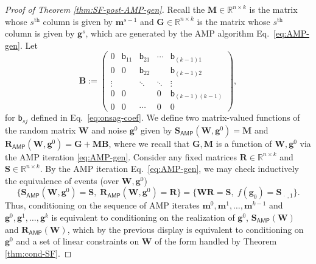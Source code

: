 \documentclass[]{article}
\def\bR{{\boldsymbol R}}
\def\sb{{\mathsf b}}
\def\bW{{\boldsymbol W}}
\def\bM{{\boldsymbol M}}
\def\bS{\boldsymbol{S}}
\def\bB{{\boldsymbol B}}
\def\bg{{\boldsymbol g}}
\def\reals{{\mathbb R}}
\def\bW{{\boldsymbol W}}
\def\bG{{\boldsymbol G}}
\def\bg{{\boldsymbol g}}
\def\bbm{{\boldsymbol m}}
\def\AMP{\mathsf{AMP}}
\begin{document}
\begin{proof}[Proof of Theorem \ref{thm:SF-post-AMP-gen}]
    Recall the $\bM \in \reals^{n \times k}$ is the matrix whose $s^\text{th}$ column is given by $\bbm^{s-1}$ and $\bG \in \reals^{n \times k}$ is the matrix whose $s^\text{th}$ column is given by $\bg^s$, 
    which are generated by the AMP algorithm Eq.~\eqref{eq:AMP-gen}.
    Let 
    \begin{equation}
        \bB 
        := 
        \begin{pmatrix}
            0      & \sb_{11} & \sb_{21}     & \cdots & \sb_{(k-1)1} \\[5pt]
            0      & 0     & \sb_{22} & & \sb_{(k-1)2} \\[5pt]
            \vdots &       & \ddots     & \ddots & \vdots \\[5pt]
            0 &  0     &       & 0 & \sb_{(k-1)(k-1)} \\[5pt]
            0      & 0     &    \cdots   & 0 & 0
        \end{pmatrix},
    \end{equation}
    for $\sb_{sj}$ defined in Eq.~\eqref{eq:onsag-coef}.
    We define two matrix-valued functions of the random matrix $\bW$ and noise $\bg^0$
    given by $\bS_{\AMP}(\bW,\bg^0) = \bM$ and $\bR_{\AMP}(\bW,\bg^0) = \bG + \bM \bB$,
    where we recall that $\bG,\bM$ is a function of $\bW,\bg^0$ via the AMP iteration \eqref{eq:AMP-gen}.
    Consider any fixed matrices $\bR \in \reals^{n \times k}$ and $\bS \in \reals^{n \times k}$.
    By the AMP iteration Eq.~\eqref{eq:AMP-gen},
    we may check inductively the equivalence of events (over $\bW,\bg^0$)
    \begin{equation}
        \Big\{ \bS_{\AMP}(\bW,\bg^0) = \bS,\; \bR_{\AMP}(\bW,\bg^0) = \bR \Big\}
        = 
        \Big\{ \bW \bR = \bS ,\; f(\bg_0) = \bS_{\,\cdot\,,1}\Big\}.
    \end{equation}
    Thus, conditioning on the sequence of AMP iterates $\bbm^0,\bbm^1,\ldots,\bbm^{k-1}$ and $\bg^0,\bg^1,\ldots,\bg^k$ is equivalent to conditioning on the realization of $\bg^0$, $\bS_{\AMP}(\bW)$ and $\bR_{\AMP}(\bW)$,
    which by the previous display is equivalent to conditioning on $\bg^0$ and a set of linear constraints on $\bW$ of the form handled by Theorem \ref{thm:cond-SF}.


\end{proof}
\end{document}
